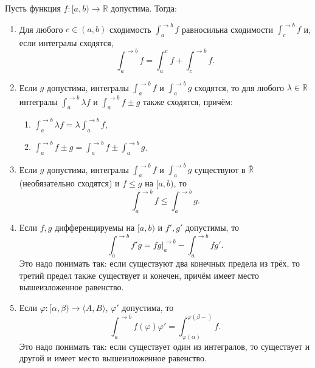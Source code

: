 \hypertarget{svva}{}
\begin{theorem}
	Пусть функция \(f \colon [a, b) \to \mathbb{R}\) допустима. Тогда:
	\begin{enumerate}
		\item Для любого \(c \in (a, b)\) сходимость \(\int_a^{\to b} f\) равносильна сходимости \(\int_c^{\to b} f\) и, если интегралы сходятся, \[
		\int_a^{\to b} f = \int_a^c f + \int_c^{\to b} f.
		\]
		\item Если \(g\) допустима, интегралы \(\int_a^{\to b} f\) и \(\int_a^{\to b} g\) сходятся, то для любого \(\lambda \in \mathbb{R}\) интегралы \(\int_a^{\to b} \lambda f\) и \(\int_a^{\to b} f \pm g\) также сходятся, причём:
		\begin{enumerate}
			\item \(\displaystyle\int_a^{\to b} \lambda f = \lambda \displaystyle\int_a^{\to b} f\),
			\item \(\displaystyle\int_a^{\to b} f \pm g = \displaystyle\int_a^{\to b} f \pm \displaystyle\int_a^{\to b} g\).
		\end{enumerate}
		\item Если \(g\) допустима, интегралы \(\int_a^{\to b} f\) и \(\int_a^{\to b} g\) существуют в \(\overline{\mathbb{R}}\) (необязательно сходятся) и \(f \leqslant g\) на \([a, b)\), то \[
		\int_a^{\to b} f \leqslant \int_a^{\to b} g.
		\]
		\item Если \(f, g\) дифференцируемы на \([a, b)\) и \(f', g'\) допустимы, то \[
		\int_a^{\to b} f'g = fg \bigg|_a^{\to b} - \int_a^{\to b} fg'.
		\]
		Это надо понимать так: если существуют два конечных предела из трёх, то третий предел также существует и конечен, причём имеет место вышеизложенное равенство.
		\item Если \(\varphi \colon [\alpha, \beta) \to \langle A, B \rangle\), \(\varphi'\) допустима, то \[
		\int_a^{\to b} f(\varphi) \varphi' = \int_{\varphi(\alpha)}^{\varphi(\beta-)} f.
		\]
		Это надо понимать так: если существует один из интегралов, то существует и другой и имеет место вышеизложенное равенство.
	\end{enumerate}
\end{theorem}

